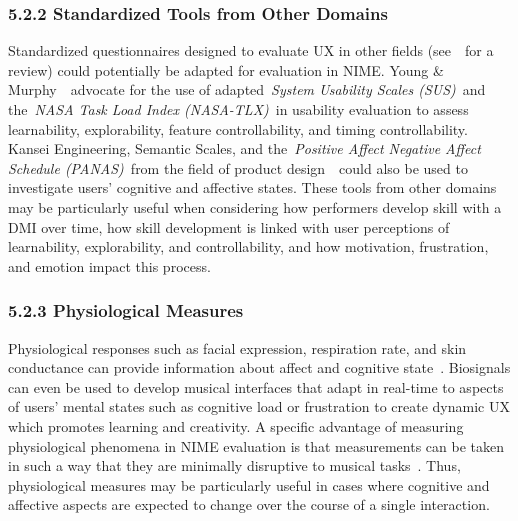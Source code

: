 \documentclass[sigconf]{nimeart}
\begin{document}
\subsubsection{5.2.2 Standardized Tools from Other Domains}\label{standardized-tools-from-other-domains}

Standardized questionnaires designed to evaluate UX in other fields (see~\cite{c26}~for a review) could potentially be adapted for evaluation in NIME. Young \& Murphy~\cite{c21}~advocate for the use of adapted~\emph{System Usability Scales (SUS)}~and the~\emph{NASA Task Load Index (NASA-TLX)}~in usability evaluation to assess learnability, explorability, feature controllability, and timing controllability. Kansei Engineering, Semantic Scales, and the~\emph{Positive Affect Negative Affect Schedule (PANAS)}~from the field of product design~\cite{c19}~could also be used to investigate users' cognitive and affective states. These tools from other domains may be particularly useful when considering how performers develop skill with a DMI over time, how skill development is linked with user perceptions of learnability, explorability, and controllability, and how motivation, frustration, and emotion impact this process.

\subsubsection{5.2.3 Physiological Measures}\label{physiological-measures}

Physiological responses such as facial expression, respiration rate, and skin conductance can provide information about affect and cognitive state~\cite{c19,c27}. Biosignals can even be used to develop musical interfaces that adapt in real-time to aspects of users' mental states such as cognitive load or frustration to create dynamic UX which promotes learning and creativity. A specific advantage of measuring physiological phenomena in NIME evaluation is that measurements can be taken in such a way that they are minimally disruptive to musical tasks~\cite{c28}. Thus, physiological measures may be particularly useful in cases where cognitive and affective aspects are expected to change over the course of a single interaction.
\end{document}
